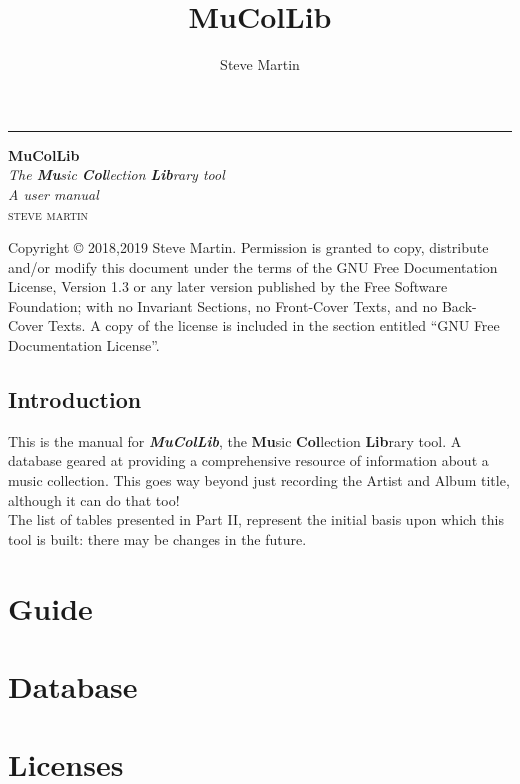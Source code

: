 \documentclass[12pt,a4paper,final,twoside,titlepage]{book}
\author{\LARGE Steve Martin}
\title{\Huge MuColLib}
\begin{document}

\begin{titlepage} %
	
	\raggedleft %
	
	\rule{1pt}{\textheight} %
	\hspace{0.05\textwidth} %
	\parbox[b]{0.75\textwidth}{ %
		
		{\Huge\bfseries MuColLib}\\[2\baselineskip] %
		{\large\textit{The \textbf{Mu}sic \textbf{Col}lection \textbf{Lib}rary tool}}\\
		{\large\textit{A user manual}}\\[4\baselineskip] %
		{\Large\textsc{steve martin}} %
		\vspace{0.5\textheight} %
	}

\end{titlepage}
\null
\vfill
Copyright \copyright{}  2018,2019  Steve Martin.
Permission is granted to copy, distribute and/or modify this document
under the terms of the GNU Free Documentation License, Version 1.3
or any later version published by the Free Software Foundation;
with no Invariant Sections, no Front-Cover Texts, and no Back-Cover Texts.
A copy of the license is included in the section entitled ``GNU
Free Documentation License''.
\frontmatter
\tableofcontents
\newpage
\chapter{Introduction}
This is the manual for \textbf{\textit{MuColLib}}, the \textbf{Mu}sic \textbf{Col}lection \textbf{Lib}rary tool. A database geared at providing a comprehensive resource of information about a music collection.  This goes way beyond just recording the Artist and Album title, although it can do that too!
\\

The list of tables presented in Part II, represent the initial basis upon which this tool is built: there may be changes in the future.
 
\mainmatter
\part{Guide}



\part{Database}

\part{Licenses}

\newpage

\end{document}

